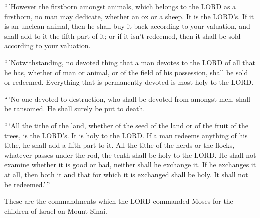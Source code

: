  ``\,'However the firstborn amongst animals, which belongs
to the LORD as a firstborn, no man may dedicate, whether an ox or a
sheep. It is the LORD's.  If it is an unclean animal, then
he shall buy it back according to your valuation, and shall add to it
the fifth part of it; or if it isn't redeemed, then it shall be sold
according to your valuation.

 ``\,'Notwithstanding, no devoted thing that a man devotes
to the LORD of all that he has, whether of man or animal, or of the
field of his possession, shall be sold or redeemed. Everything that is
permanently devoted is most holy to the LORD.

 ``\,'No one devoted to destruction, who shall be devoted
from amongst men, shall be ransomed. He shall surely be put to death.

 ``\,`All the tithe of the land, whether of the seed of the
land or of the fruit of the trees, is the LORD's. It is holy to the
LORD.  If a man redeems anything of his tithe, he shall add
a fifth part to it.  All the tithe of the herds or the
flocks, whatever passes under the rod, the tenth shall be holy to the
LORD.  He shall not examine whether it is good or bad,
neither shall he exchange it. If he exchanges it at all, then both it
and that for which it is exchanged shall be holy. It shall not be
redeemed.'\,''

 These are the commandments which the LORD commanded Moses
for the children of Israel on Mount Sinai.
